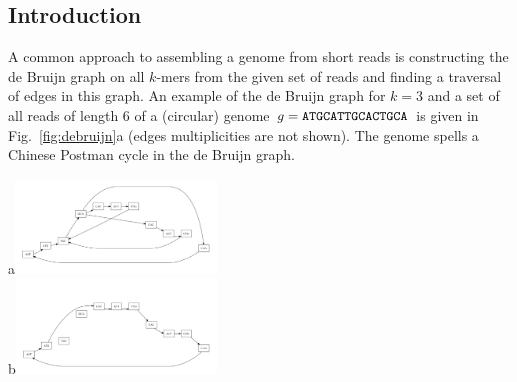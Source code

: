\documentclass[17pt]{extarticle}
\theoremstyle{definition}
\begin{document}
\begin{multicols}{2}

\section{Introduction}
A common approach to assembling a genome from short reads is constructing
the de Bruijn graph \cite{PW01} on all $k$-mers from the given set of 
reads and finding a traversal of edges in this graph.
An example of the de Bruijn graph for $k=3$ and a set of all reads of length $6$
of a (circular) genome $g={\tt ATGCATTGCACTGCA}$ is given in Fig.~\ref{fig:debruijn}a
(edges multiplicities are not shown). The genome spells a Chinese Postman
cycle in the de Bruijn graph.

\begin{center}
a\includegraphics[width=0.4\textwidth]{ATGCATTGCACTGCA_debruijn.pdf}\\
b\includegraphics[width=0.4\textwidth]{ATGCATTGCACTGCA_earmark.pdf}\\
\end{center}


\end{multicols}
\end{document}
